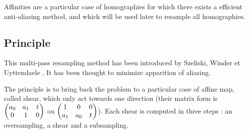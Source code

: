 

Affinities are a particular case of homographies for which there exists a efficient anti-aliasing method, and which will be used later to resample all homographies.

\subsection{Principle}
	
	This multi-pass resampling method has been introduced by Szeliski, Winder et Uyttendaele \cite{szeliski2010high}. It has been thought to minimize apparition of aliasing.

	
	The principle is to bring back the problem to a particular case of affine map, called shear, which only act towards one direction (their matrix form is $\begin{pmatrix} a_0 & a_1 & t\\ 0 & 1 & 0 \end{pmatrix}$ ou $\begin{pmatrix} 1 & 0 & 0\\ a_1 & a_0 & t \end{pmatrix}$). Each shear is computed in three steps : an oversampling, a shear and a subsampling.
	
	

